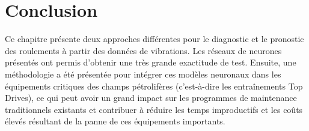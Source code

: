 \section{Conclusion}
Ce chapitre présente deux approches différentes pour le diagnostic et le pronostic des roulements à partir des données de vibrations. Les réseaux de neurones présentés ont permis d'obtenir une très grande exactitude de test. Ensuite, une méthodologie a été présentée pour intégrer ces modèles neuronaux dans les équipements critiques des champs pétrolifères (c'est-à-dire les entraînements Top Drives), ce qui peut avoir un grand impact sur les programmes de maintenance traditionnels existants et contribuer à réduire les temps improductifs et les coûts élevés résultant de la panne de ces équipements importants.


